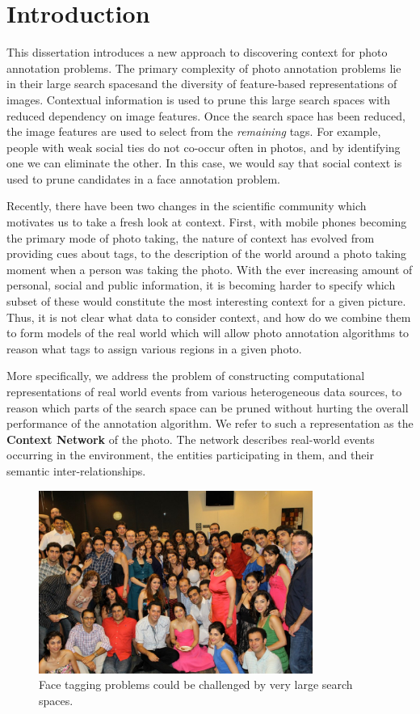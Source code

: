 \chapter{Introduction}

This dissertation introduces a new approach to discovering context for photo annotation problems. The primary complexity of photo annotation problems lie in their large search spacesand the diversity of feature-based representations of images. Contextual information is used to prune this large search spaces with reduced dependency on image features. Once the search space has been reduced, the image features are used to select from the \textit{remaining} tags. For example, people with weak social ties do not co-occur often in photos, and by identifying one we can eliminate the other. In this case, we would say that social context is used to prune candidates in a face annotation problem.

Recently, there have been two changes in the scientific community which motivates us to take a fresh look at context. First, with mobile phones becoming the primary mode of photo taking, the nature of context has evolved from providing cues about tags, to the description of the world around a photo taking moment when a person was taking the photo. With the ever increasing amount of personal, social and public information, it is becoming harder to specify which subset of these would constitute the most interesting context for a given picture. Thus, it is not clear what data to consider context, and how do we combine them to form models of the real world which will allow photo annotation algorithms to reason what tags to assign various regions in a given photo.

More specifically, we address the problem of constructing computational representations of real world events from various heterogeneous data sources, to reason which parts of the search space can be pruned without hurting the overall performance of the annotation algorithm. We refer to such a representation as the \textbf{Context Network} of the photo. The network describes real-world events occurring in the environment, the entities participating in them, and their semantic inter-relationships.

\begin{figure}[t]
\centering
\includegraphics[width=0.8\textwidth]{media/chapter1/setarehetal}
\caption{Face tagging problems could be challenged by very large search spaces.}
\label{fig:people}
\end{figure}

